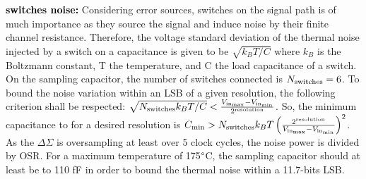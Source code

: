 
\textbf{\textcolor{black}{switches noise:}}
Considering error sources, switches on the signal path is of much importance as they source the signal and induce noise by their finite channel resistance. 
Therefore, the voltage standard deviation of the thermal noise injected by a switch on a capacitance is given to be \(\sqrt{k_BT/C} \) where \(k_B\) is the Boltzmann constant, T the temperature, and C the load capacitance of a switch. On the sampling capacitor, the number of switches connected is $N_{\rm switches} = 6$. To bound the noise variation within an LSB of a given resolution, the following criterion shall be respected: $\sqrt{N_{\rm switches} k_BT/C} < \frac{V_{\rm in_{\max}}-V_{\rm in_{\min}}}{2^{\rm resolution}}$. So, the minimum capacitance to for a desired resolution is $C_{\min} > N_{\rm switches} k_BT \left(\frac{2^{\rm resolution}}{V_{\rm in_{\max}}-V_{\rm in_{\min}}} \right)^2$. As the $\Delta\Sigma$ is oversampling at least over 5 clock cycles, the noise power is divided by OSR\@. For a maximum temperature of 175\(\degree \)C, the sampling capacitor should at least be to 110 fF in order to bound the thermal noise within a 11.7-bits LSB\@.

